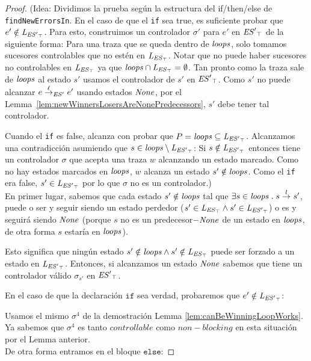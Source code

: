 \begin{proof}
	(Idea: Dividimos la prueba según la estructura del  if/then/else de \texttt{findNewErrorsIn}. 
	En el caso de que el \texttt{if} sea true, es suficiente probar que $e' \notin \mathit{L_{\mathit{{\mathit{ES}'}_{\top}}}}$. Para esto, 
	construimos un controlador $\sigma'$ para $e'$ en $\mathit{{\mathit{ES}'}_{\top}}$ de la siguiente forma: Para una traza que se queda dentro de $\mathit{loops}$, solo tomamos sucesores controlables que no estén en $\mathit{L_{\mathit{{\mathit{ES}}_{\top}}}}$. Notar que no puede haber sucesores no controlables en $\mathit{L_{\mathit{{\mathit{ES}}_{\top}}}}$ ya que
	$\mathit{loops} \cap \mathit{L_{\mathit{{\mathit{ES}}_{\top}}}}= \emptyset$. Tan pronto como la traza sale de $\mathit{loops}$ al estado $s'$ usamos el controlador de $s'$ en $\mathit{{\mathit{ES}'}_{\top}}$. 
	Como $s'$ no puede alcanzar $e \overset{\ell}{\rightarrow}_{\mathit{ES}'} 
	e'$ usando estados $\mathit{None}$, por el 
	Lemma~\ref{lem:newWinnersLosersAreNonePredecessors}, $s'$ debe tener tal controlador. 
	
	Cuando el \texttt{if} es false, alcanza con probar que $P = \mathit{loops} \subseteq \mathit{L_{\mathit{{\mathit{ES}'}_{\top}}}}$. Alcanzamos una contradicción asumiendo que $s \in \mathit{loops} \setminus \mathit{L_{\mathit{{\mathit{ES}'}_{\top}}}}$: Si $s 
	\notin \mathit{L_{\mathit{{\mathit{ES}'}_{\top}}}}$ entonces tiene un controlador $\sigma$ que acepta una traza $w$ alcanzando un estado marcado. Como no hay estados marcados en $\mathit{loops}$, $w$ alcanza un estado $s' \notin \mathit{loops}$. Como el
	\texttt{if} era false, $s' \in \mathit{L_{\mathit{{\mathit{ES}'}_{\top}}}}$ por lo que $\sigma$ no es un controlador.)\\
	


En primer lugar, sabemos que cada estado $s' \notin \mathit{loops}$ tal que $\exists s \in \mathit{loops} \;.\; s 
\overset{l}{\rightarrow}_{} s'$, puede o ser y seguir siendo un estado perdedor ($s' \in \mathit{L_{\mathit{{\mathit{ES}}_{\top}}}} \wedge s' \in \mathit{L_{\mathit{{\mathit{ES}'}_{\top}}}}$) o es y seguirá siendo $\mathit{None}$ (porque $s$ no es un predecesor$-\mathit{None}$ de un estado en $\mathit{loops}$, de otra forma $s$ estaría en $\mathit{loops}$). 

Esto significa que ningún estado $s' \notin \mathit{loops} \wedge s' \notin \mathit{L_{\mathit{{\mathit{ES}}_{\top}}}}$ puede ser forzado a un estado en $\mathit{L_{\mathit{{\mathit{ES}'}_{\top}}}}$. Entonces, si alcanzamos un estado $\mathit{None}$ sabemos que tiene un controlador válido $\sigma_{s'}$ en $\mathit{{\mathit{ES}'}_{\top}}$.

En el caso de que la declaración $\texttt{if}$ sea verdad, probaremos que $e' \notin \mathit{L_{\mathit{{\mathit{ES}'}_{\top}}}}$:

Usamos el mismo $\sigma^4$ de la demostración Lemma \ref{lem:canBeWinningLoopWorks}. Ya sabemos que $\sigma^4$ es tanto $controllable$ como $non-blocking$ en esta situación por el Lemma anterior.\\

De otra forma entramos en el bloque $\texttt{else}$:


\end{proof}
